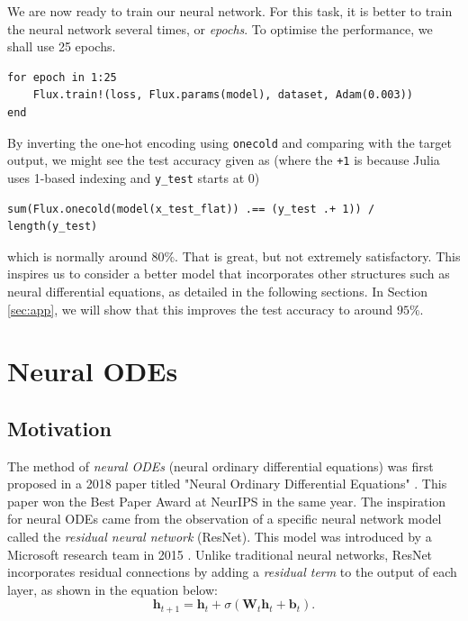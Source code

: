 \documentclass[a4paper,11pt,titlepage]{article}
\theoremstyle{definition}
\theoremstyle{plain}
\theoremstyle{remark}
\begin{document}
We are now ready to train our neural network. For this task, it is better to train the neural network several times, or \textit{epochs}. To optimise the performance, we shall use 25 epochs.

\begin{verbatim}
for epoch in 1:25
    Flux.train!(loss, Flux.params(model), dataset, Adam(0.003))
end
\end{verbatim}

By inverting the one-hot encoding using \verb|onecold| and comparing with the target output, we might see the test accuracy given as (where the \verb|+1| is because Julia uses 1-based indexing and \verb|y_test| starts at 0)

\begin{verbatim}
sum(Flux.onecold(model(x_test_flat)) .== (y_test .+ 1)) / length(y_test)
\end{verbatim}

which is normally around $80\%$.  That is great, but not extremely satisfactory. This inspires us to consider a better model that incorporates other structures such as neural differential equations, as detailed in the following sections. In Section \ref{sec:app}, we will show that this improves the test accuracy to around $95\%$.

\pagebreak
\section{Neural ODEs}
\label{sec:intro}

\subsection{Motivation}

The method of \textit{neural ODEs} (neural ordinary differential equations) was first proposed in a 2018 paper titled "Neural Ordinary Differential Equations" \cite{chen2018neural}. This paper won the Best Paper Award at NeurIPS in the same year. The inspiration for neural ODEs came from the observation of a specific neural network model called the \textit{residual neural network} (ResNet). This model was introduced by a Microsoft research team in 2015 \cite{he2016deep}. Unlike traditional neural networks, ResNet incorporates residual connections by adding a \textit{residual term} to the output of each layer, as shown in the equation below:
\begin{equation}\label{eq1}
    \textbf{h}_{t+1} = \textbf{h}_t + \sigma\left(\textbf{W}_t\textbf{h}_t + \textbf{b}_t\right).\tag{1}
\end{equation}
\end{document}
